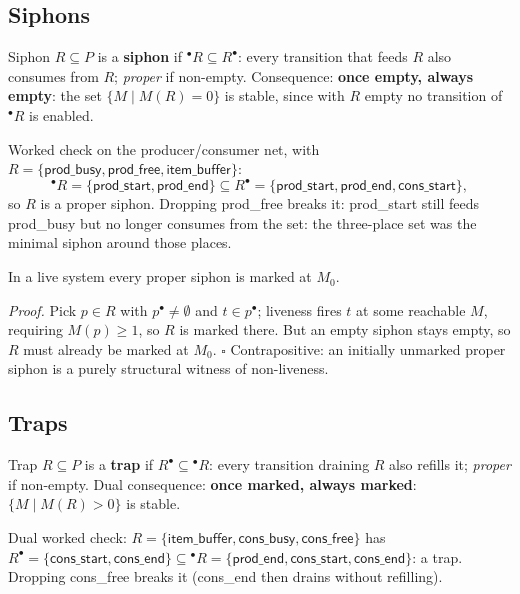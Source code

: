 \subsection{Siphons}

\begin{definitionbox}{Siphon}
$R \subseteq P$ is a \textbf{siphon} if ${}^\bullet R \subseteq R^\bullet$: every transition that feeds $R$ also consumes from $R$; \emph{proper} if non-empty. Consequence: \textbf{once empty, always empty}: the set $\{M \mid M(R) = 0\}$ is stable, since with $R$ empty no transition of ${}^\bullet R$ is enabled.
\end{definitionbox}

Worked check on the producer/consumer net, with $R = \{\textsf{prod\_busy}, \textsf{prod\_free}, \textsf{item\_buffer}\}$:
\[
  {}^\bullet R = \{\textsf{prod\_start}, \textsf{prod\_end}\}
  \subseteq
  R^\bullet = \{\textsf{prod\_start}, \textsf{prod\_end}, \textsf{cons\_start}\},
\]
so $R$ is a proper siphon. Dropping \textsf{prod\_free} breaks it: \textsf{prod\_start} still feeds \textsf{prod\_busy} but no longer consumes from the set: the three-place set was the minimal siphon around those places.

\begin{proposition}
In a live system every proper siphon is marked at $M_0$.
\end{proposition}
\textit{Proof.} Pick $p \in R$ with $p^\bullet \neq \emptyset$ and $t \in p^\bullet$; liveness fires $t$ at some reachable $M$, requiring $M(p) \geq 1$, so $R$ is marked there. But an empty siphon stays empty, so $R$ must already be marked at $M_0$. \hfill$\square$ Contrapositive: an initially unmarked proper siphon is a purely structural witness of non-liveness.

\subsection{Traps}

\begin{definitionbox}{Trap}
$R \subseteq P$ is a \textbf{trap} if $R^\bullet \subseteq {}^\bullet R$: every transition draining $R$ also refills it; \emph{proper} if non-empty. Dual consequence: \textbf{once marked, always marked}: $\{M \mid M(R) > 0\}$ is stable.
\end{definitionbox}

Dual worked check: $R = \{\textsf{item\_buffer}, \textsf{cons\_busy}, \textsf{cons\_free}\}$ has $R^\bullet = \{\textsf{cons\_start}, \textsf{cons\_end}\} \subseteq {}^\bullet R = \{\textsf{prod\_end}, \textsf{cons\_start}, \textsf{cons\_end}\}$: a trap. Dropping \textsf{cons\_free} breaks it (\textsf{cons\_end} then drains without refilling).


